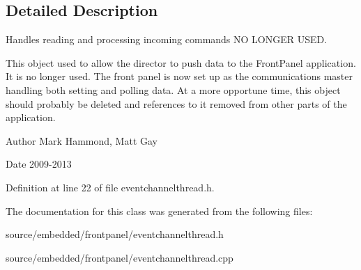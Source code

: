 \subsection{Detailed Description}
Handles reading and processing incoming commands N\-O L\-O\-N\-G\-E\-R U\-S\-E\-D. 

This object used to allow the director to push data to the Front\-Panel application. It is no longer used. The front panel is now set up as the communications master handling both setting and polling data. At a more opportune time, this object should probably be deleted and references to it removed from other parts of the application. \begin{DoxyAuthor}{Author}
Mark Hammond, Matt Gay 
\end{DoxyAuthor}
\begin{DoxyDate}{Date}
2009-\/2013 
\end{DoxyDate}


Definition at line 22 of file eventchannelthread.\-h.



The documentation for this class was generated from the following files\-:\begin{DoxyCompactItemize}
\item 
source/embedded/frontpanel/eventchannelthread.\-h\item 
source/embedded/frontpanel/eventchannelthread.\-cpp\end{DoxyCompactItemize}

